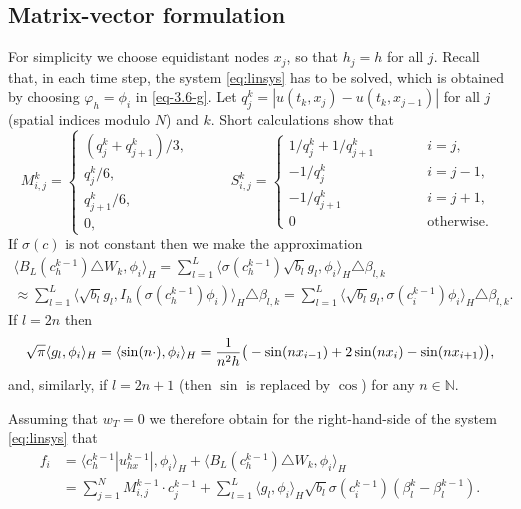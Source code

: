\documentclass[a4paper,10pt]{article}
\newcommand{\N}{\mathbb{N}}
\def\Bapprox{B_L}
\numberwithin{equation}{section}
\begin{document}
\subsection{Matrix-vector formulation}

For simplicity we choose equidistant nodes $x_{j}$, so that $h_{j}=h$ for all $j$.
Recall that, in each time step, the system \eqref{eq:linsys} has to be solved, which is obtained by choosing $\varphi_{h} = \phi_i$ in \eqref{eq-3.6-g}. Let $q^{k}_{j} = |u(t_{k},x_{j}) - u(t_{k},x_{j-1})|$ for all $j$ (spatial indices modulo $N$) and $k$. Short calculations show that
\[
 M^{k}_{i,j} =
 \begin{cases}
 (q_{j}^{k} + q_{j+1}^{k}) / 3, & \\
 q_{j}^{k}/6, & \\
 q_{j+1}^{k}/6, & \\
 0, &
 \end{cases}
 \qquad
 S^{k}_{i,j} =
 \begin{cases}
 1/q_{j}^{k} + 1/q_{j+1}^{k} & \qquad \quad i=j, \\
 -1/q_{j}^{k} & \qquad \quad i=j-1, \\
 -1/q_{j+1}^{k} & \qquad \quad i=j+1, \\
 0 & \qquad \quad \mbox{otherwise. }
 \end{cases}
\]
If $\sigma(c)$ is not constant then we make the approximation
\begin{multline*}
 \langle \Bapprox(c^{k-1}_{h}) \triangle W_{k}, \phi_{i} \rangle_{H}
 = \sum_{l=1}^{L} \langle \sigma(c^{k-1}_{h}) \sqrt{b_{l}} g_{l}, \phi_{i} \rangle_{H} \triangle \beta_{l,k} \\
 \approx \sum_{l=1}^{L} \langle \sqrt{b_{l}} g_{l}, I_{h} (\sigma(c^{k-1}_{h}) \phi_{i}) \rangle_{H} \triangle \beta_{l,k}
 = \sum_{l=1}^{L} \langle \sqrt{b_{l}} g_{l}, \sigma(c_{i}^{k-1}) \phi_{i} \rangle_{H} \triangle \beta_{l,k}.
\end{multline*}
If $l = 2n$ then
\[
 \sqrt{\pi} \langle g_{l}, \phi_{i} \rangle_{H} = \langle \sin(n \cdot), \phi_{i} \rangle_{H}
 = \frac{1}{n^2 h} \big{(} - \sin(n x_{i-1}) + 2 \sin(n x_{i}) - \sin(n x_{i+1}) \big{)},
\]
and, similarly, if $l = 2n+1$ (then $\sin$ is replaced by $\cos$)
for any $n \in \N$.

Assuming that $w_T = 0$ we therefore obtain for the right-hand-side of the system \eqref{eq:linsys} that
\begin{align*}
f_{i}
&= \langle c^{k-1}_{h} | u^{k-1}_{hx}|, \phi_{i} \rangle_{H}
+ \langle \Bapprox(c^{k-1}_{h}) \triangle W_{k}, \phi_{i} \rangle_{H} \\
&= \sum_{j=1}^N M^{k-1}_{i,j} \cdot c^{k-1}_{j}
+ \sum_{l=1}^L \langle g_{l}, \phi_{i} \rangle_{H} \sqrt{b_{l}} \sigma(c_{i}^{k-1}) (\beta^{k}_{l} - \beta^{k-1}_{l}).
\end{align*}
\end{document}
